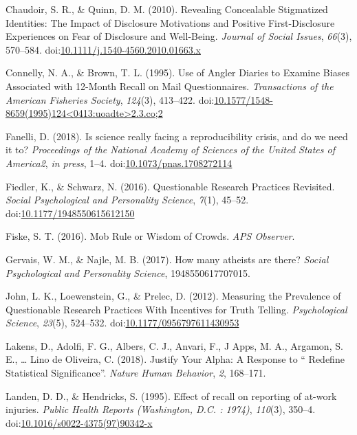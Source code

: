 \documentclass[man]{apa6}
\theoremstyle{definition}
\theoremstyle{definition}
\theoremstyle{definition}
\theoremstyle{remark}
\begin{document}
\hypertarget{ref-Chaudoir2010}{}
Chaudoir, S. R., \& Quinn, D. M. (2010). Revealing Concealable
Stigmatized Identities: The Impact of Disclosure Motivations and
Positive First-Disclosure Experiences on Fear of Disclosure and
Well-Being. \emph{Journal of Social Issues}, \emph{66}(3), 570--584.
doi:\href{https://doi.org/10.1111/j.1540-4560.2010.01663.x}{10.1111/j.1540-4560.2010.01663.x}

\hypertarget{ref-Connelly1995}{}
Connelly, N. A., \& Brown, T. L. (1995). Use of Angler Diaries to
Examine Biases Associated with 12-Month Recall on Mail Questionnaires.
\emph{Transactions of the American Fisheries Society}, \emph{124}(3),
413--422.
doi:\href{https://doi.org/10.1577/1548-8659(1995)124\%3C0413:uoadte\%3E2.3.co;2}{10.1577/1548-8659(1995)124\textless{}0413:uoadte\textgreater{}2.3.co;2}

\hypertarget{ref-Fanelli2018}{}
Fanelli, D. (2018). Is science really facing a reproducibility crisis,
and do we need it to? \emph{Proceedings of the National Academy of
Sciences of the United States of America2}, \emph{in press}, 1--4.
doi:\href{https://doi.org/10.1073/pnas.1708272114}{10.1073/pnas.1708272114}

\hypertarget{ref-Fiedler2016}{}
Fiedler, K., \& Schwarz, N. (2016). Questionable Research Practices
Revisited. \emph{Social Psychological and Personality Science},
\emph{7}(1), 45--52.
doi:\href{https://doi.org/10.1177/1948550615612150}{10.1177/1948550615612150}

\hypertarget{ref-Fiske2016}{}
Fiske, S. T. (2016). Mob Rule or Wisdom of Crowds. \emph{APS Observer}.

\hypertarget{ref-Gervais2017}{}
Gervais, W. M., \& Najle, M. B. (2017). How many atheists are there?
\emph{Social Psychological and Personality Science}, 1948550617707015.

\hypertarget{ref-John2012}{}
John, L. K., Loewenstein, G., \& Prelec, D. (2012). Measuring the
Prevalence of Questionable Research Practices With Incentives for Truth
Telling. \emph{Psychological Science}, \emph{23}(5), 524--532.
doi:\href{https://doi.org/10.1177/0956797611430953}{10.1177/0956797611430953}

\hypertarget{ref-Lakensabc1860}{}
Lakens, D., Adolfi, F. G., Albers, C. J., Anvari, F., J Apps, M. A.,
Argamon, S. E., \ldots{} Lino de Oliveira, C. (2018). Justify Your
Alpha: A Response to `` Redefine Statistical Significance''.
\emph{Nature Human Behavior}, \emph{2}, 168--171.

\hypertarget{ref-Landen1995}{}
Landen, D. D., \& Hendricks, S. (1995). Effect of recall on reporting of
at-work injuries. \emph{Public Health Reports (Washington, D.C. :
1974)}, \emph{110}(3), 350--4.
doi:\href{https://doi.org/10.1016/s0022-4375(97)90342-x}{10.1016/s0022-4375(97)90342-x}
\end{document}
